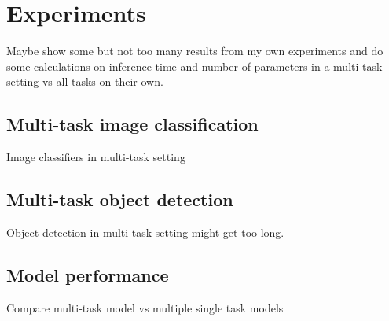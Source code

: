 
\chapter{Experiments}
Maybe show some but not too many results from my own experiments and do some calculations on inference time and number of parameters in a multi-task setting vs all tasks on their own.
\section{Multi-task image classification}
Image classifiers in multi-task setting
\section{Multi-task object detection}
Object detection in multi-task setting might get too long.
\section{Model performance}
Compare multi-task model vs multiple single task models